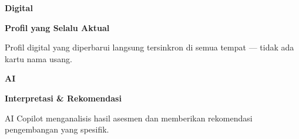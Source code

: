 \documentclass[a4paper]{article}
\begin{document}
\begin{minipage}[t]{0.485\textwidth}
    \noindent\colorbox{BlueBg}{%
        \begin{minipage}[t][2.7cm][c]{\dimexpr\linewidth-2\fboxsep\relax}
            \centering
            {\fontsize{20}{24}\selectfont\bfseries\color{FuchsiaPrimary} Digital}\par\vspace{2pt}
            {\fontsize{9.5}{12}\selectfont\bfseries\color{BlueDark} Profil yang Selalu Aktual}\par\vspace{2pt}
            {\fontsize{8.5}{11}\selectfont\color{TextDark}Profil digital yang diperbarui langsung tersinkron di semua tempat --- tidak ada kartu nama usang.}
        \end{minipage}}\par
    \vspace{6pt}
    \noindent\colorbox{BlueBg}{%
        \begin{minipage}[t][2.7cm][c]{\dimexpr\linewidth-2\fboxsep\relax}
            \centering
            {\fontsize{20}{24}\selectfont\bfseries\color{FuchsiaPrimary} AI}\par\vspace{2pt}
            {\fontsize{9.5}{12}\selectfont\bfseries\color{BlueDark} Interpretasi \& Rekomendasi}\par\vspace{2pt}
            {\fontsize{8.5}{11}\selectfont\color{TextDark}AI Copilot menganalisis hasil asesmen dan memberikan rekomendasi pengembangan yang spesifik.}
        \end{minipage}}%
\end{minipage}

\vspace{8pt}
\end{document}
